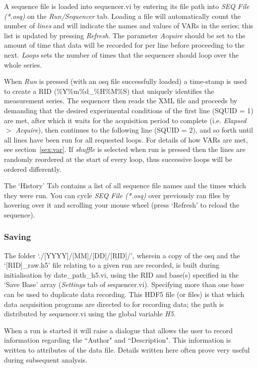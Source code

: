 \documentclass[10pt,a4paper]{article}
\begin{document}
A sequence file is loaded into sequencer.vi by entering its file path into  \emph{SEQ File (*.osq)} on the \emph{Run/Sequencer} tab.  Loading a file will automatically count the number of \emph{lines} and will indicate the names and values of VARs in the series; this list is updated by pressing \emph{Refresh}.  The parameter \emph{Acquire} should be set to the amount of time that data will be recorded for per line before proceeding to the next. \emph{Loops} sets the number of times that the sequencer should loop over the whole series. 

When \emph{Run} is pressed (with an osq file successfully loaded) a time-stamp is used to create a RID (\%Y\%m\%d\_\%H\%M\%S) that uniquely identifies the measurement series. The sequencer then reads the XML file and proceeds by demanding that the desired experimental conditions of the first line (SQUID = 1) are met, after which it waits for the acquisition period to complete (i.e. \emph{Elapsed} $>$ \emph{Acquire}), then continues to the following line (SQUID = 2), and so forth until all lines have been run for all requested loops.  For details of how VARs are met, see section~\ref{sex:var}.  If \emph{shuffle} is selected when run is pressed then the lines are randomly reordered at the start of every loop, thus successive loops will be ordered differently.

The `History' Tab contains a list of all sequence file names and the times which they were run.  You can cycle \emph{SEQ File (*.osq)} over previously ran files by hovering over it and scrolling your mouse wheel (press `Refresh' to reload the sequence).

\subsubsection{Saving}
The folder `./[YYYY]/[MM]/[DD]/[RID]/', wherein a copy of the osq and the `[RID]\_raw.h5' file relating to a given run are recorded, is built during initialisation by date\_path\_h5.vi, using the RID and base(s) specified in the `Save Base' array (\emph{Settings} tab of sequencer.vi).   Specifying more than one base can be used to duplicate data recording.  This HDF5 file (or files) is that which data acquisition programs are directed to for recording data; the path is distributed by sequencer.vi using the global variable \emph{H5}.

When a run is started it will raise a dialogue that allows the user to record information regarding the ``Author" and ``Description".  This information is written to attributes of the data file.  Details written here often prove very useful during subsequent analysis. 
\end{document}
